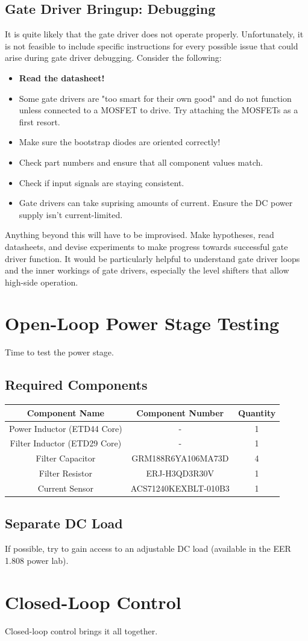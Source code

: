 \documentclass[]{report}
\begin{document}
\section{Gate Driver Bringup: Debugging}
It is quite likely that the gate driver does not operate properly. Unfortunately, it is not feasible to include specific instructions for every possible issue that could arise during gate driver debugging. Consider the following: 
\begin{itemize}
	\item \textbf{Read the datasheet!}
	\item Some gate drivers are "too smart for their own good" and do not function unless connected to a MOSFET to drive. Try attaching the MOSFETs as a first resort. 
	\item Make sure the bootstrap diodes are oriented correctly!
	\item Check part numbers and ensure that all component values match. 
	\item Check if input signals are staying consistent. 
	\item Gate drivers can take suprising amounts of current. Ensure the DC power supply isn't current-limited. 
\end{itemize}
Anything beyond this will have to be improvised. Make hypotheses, read datasheets, and devise experiments to make progress towards successful gate driver function. It would be particularly helpful to understand gate driver loops and the inner workings of gate drivers, especially the level shifters that allow high-side operation. 
\chapter{Open-Loop Power Stage Testing}
Time to test the power stage. 
\section{Required Components}
\begin{tabular}{|c|c|c|}
	\hline
	\textbf{Component Name} & \textbf{Component Number} & \textbf{Quantity} \\
	\hline
	Power Inductor (ETD44 Core) & - & 1 \\
	\hline
	Filter Inductor (ETD29 Core) & - & 1 \\
	\hline
	Filter Capacitor & GRM188R6YA106MA73D  & 4 \\
	\hline
	Filter Resistor & ERJ-H3QD3R30V & 1 \\
	\hline
	Current Sensor & ACS71240KEXBLT-010B3  & 1 \\
	\hline
\end{tabular}
\section{Separate DC Load}
If possible, try to gain access to an adjustable DC load (available in the EER 1.808 power lab). 
\chapter{Closed-Loop Control}
Closed-loop control brings it all together. 
\vspace{1cm}


\end{document}
